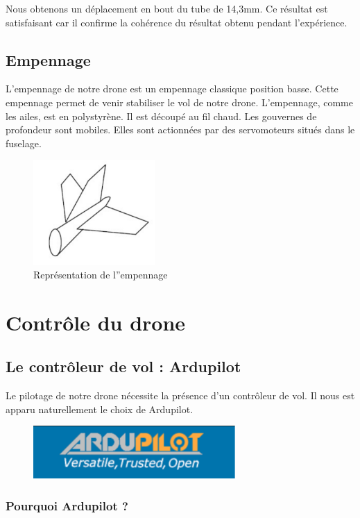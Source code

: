 \documentclass[a4paper,12pt,french]{report}
\begin{document}
Nous obtenons un déplacement en bout du tube de 14,3mm. Ce résultat est satisfaisant car il confirme la cohérence du résultat obtenu pendant l'expérience.

\subsection{Empennage}

L'empennage de notre drone est un empennage classique position basse. Cette empennage permet de venir stabiliser le vol de notre drone. L'empennage, comme les ailes, est en polystyrène. Il est découpé au fil chaud. Les gouvernes de profondeur sont mobiles. Elles sont actionnées par des servomoteurs situés dans le fuselage.

\begin{figure}[h]
    \centering
    \includegraphics[height=4cm]{figures/emp.jpeg}
    \caption{Représentation de l''empennage}
    \label{emp}
\end{figure}

\newpage
\section{Contrôle du drone}

\subsection{Le contrôleur de vol : Ardupilot}

Le pilotage de notre drone nécessite la présence d’un contrôleur de vol. Il nous est apparu naturellement le choix de Ardupilot.

\begin{figure}[h]
    \centering
    \includegraphics[height=2cm]{figures/ardu.png}
\end{figure}
\subsubsection{Pourquoi Ardupilot ?}
\end{document}
